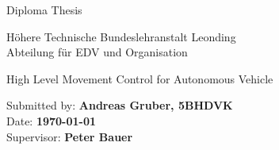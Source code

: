\cfoot{}
\begin{titlepage}
\thispagestyle{fancy}

\begin{center}

\vspace*{8em}

{\LARGE Diploma Thesis}

\vspace{2em}

{\large H\"ohere Technische Bundeslehranstalt Leonding \\[.5em]
Abteilung f\"ur EDV und Organisation}

\vspace{8em}

{\Huge High Level Movement Control for Autonomous Vehicle}
\end{center}

\vspace{18em}

Submitted by: {\bf Andreas Gruber, 5BHDVK} \\[.5em]

Date: {\bf \today} \\[.5em]

Supervisor: {\bf Peter Bauer}
\end{titlepage}